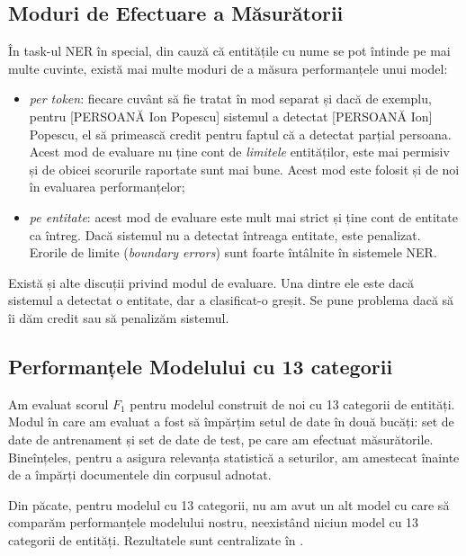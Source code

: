 \subsection{Moduri de Efectuare a Măsurătorii}

În task-ul NER în special, din cauză că entitățile cu nume se pot întinde pe mai multe cuvinte, există mai multe moduri de a măsura performanțele unui model:

\begin{itemize}
\item \textit{per token}: fiecare cuvânt să fie tratat în mod separat și dacă de exemplu, pentru [PERSOANĂ Ion Popescu] sistemul a detectat [PERSOANĂ Ion] Popescu, el să primească credit pentru faptul că a detectat parțial persoana. Acest mod de evaluare nu ține cont de \textit{limitele} entităților, este mai permisiv și de obicei scorurile raportate sunt mai bune. Acest mod este folosit și de noi în evaluarea performanțelor;

\item \textit{pe entitate}: acest mod de evaluare este mult mai strict și ține cont de entitate ca întreg. Dacă sistemul nu a detectat întreaga entitate, este penalizat. Erorile de limite (\textit{boundary errors}) sunt foarte întâlnite în sistemele NER.

\end{itemize}

Există și alte discuții privind modul de evaluare. Una dintre ele este dacă sistemul a detectat o entitate, dar a clasificat-o greșit. Se pune problema dacă să îi dăm credit sau să penalizăm sistemul.

\subsection{Performanțele Modelului cu 13 categorii}

Am evaluat scorul $F_1$ pentru modelul construit de noi cu 13 categorii de entități. Modul în care am evaluat a fost să împărțim setul de date în două bucăți: set de date de antrenament și set de date de test, pe care am efectuat măsurătorile. Bineînțeles, pentru a asigura relevanța statistică a seturilor, am amestecat înainte de a împărți documentele din corpusul adnotat.


Din păcate, pentru modelul cu 13 categorii, nu am avut un alt model cu care să comparăm performanțele modelului nostru, neexistând niciun model cu 13 categorii de entități. Rezultatele sunt centralizate în .


